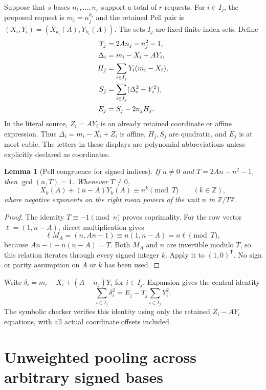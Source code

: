 \documentclass[10pt,letterpaper]{article}
\newtheorem{lemma}[theorem]{Lemma}
\theoremstyle{remark}\newtheorem{remark}[theorem]{Remark}
\newcommand{\Z}{\mathbb Z}\newcommand{\Q}{\mathbb Q}\newcommand{\N}{\mathbb N}
\begin{document}
Suppose that $s$ bases $n_1,\ldots,n_s$ support a total of $r$ requests.
For $i\in I_j$, the proposed request is $m_i=n_j^{k_i}$ and the retained
Pell pair is $(X_i,Y_i)=(X_{k_i}(A),Y_{k_i}(A))$. The sets $I_j$ are fixed
finite index sets. Define
\begin{align}
 T_j&=2An_j-n_j^2-1,\label{eq:T}\\
 \Delta_i&=m_i-X_i+AY_i,\notag\\
 H_j&=\sum_{i\in I_j}Y_i(m_i-X_i),\notag\\
 S_j&=\sum_{i\in I_j}(\Delta_i^2-Y_i^2),\notag\\
 E_j&=S_j-2n_jH_j.\label{eq:E}
\end{align}
In the literal source, $Z_i=AY_i$ is an already retained coordinate or
affine expression. Thus $\Delta_i=m_i-X_i+Z_i$ is affine, $H_j,S_j$ are
quadratic, and $E_j$ is at most cubic. The letters in these displays
are polynomial abbreviations unless explicitly declared as coordinates.

\begin{lemma}[Pell congruence for signed indices]\label{lem:pell}
If $n\ne0$ and $T=2An-n^2-1$, then $\gcd(n,T)=1$. Whenever $T\ne0$,
\[
 X_k(A)+(n-A)Y_k(A)\equiv n^k\pmod T\qquad(k\in\Z),
\]
where negative exponents on the right mean powers of the unit $n$
in $\Z/T\Z$.
\end{lemma}
\begin{proof}
The identity $T\equiv-1\pmod n$ proves coprimality. For the row vector
$\ell=(1,n-A)$, direct multiplication gives
\[
 \ell M_A=(n,An-1)\equiv n(1,n-A)=n\ell\pmod T,
\]
because $An-1-n(n-A)=T$. Both $M_A$ and $n$ are invertible modulo
$T$, so this relation iterates through every signed integer $k$.
Apply it to $(1,0)^{\mathsf T}$. No sign or parity assumption on $A$
or $k$ has been used.
\end{proof}

Write $\delta_i=m_i-X_i+(A-n_j)Y_i$ for $i\in I_j$. Expansion gives
the central identity
\begin{equation}
 \sum_{i\in I_j}\delta_i^2
 =E_j-T_j\sum_{i\in I_j}Y_i^2.\label{eq:normidentity}
\end{equation}
The symbolic checker verifies this identity using only the retained
$Z_i-AY_i$ equations, with all actual coordinate offsets included.

\section{Unweighted pooling across arbitrary signed bases}
\end{document}
